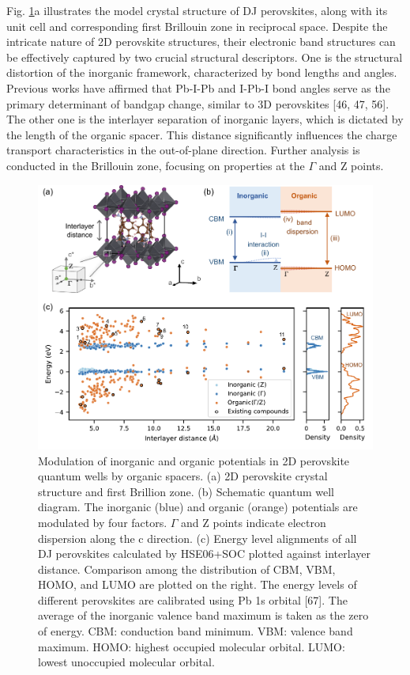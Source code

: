 Fig. \ref{f:fig3}a illustrates the model crystal structure of DJ perovskites, along with its unit cell and corresponding first Brillouin zone in reciprocal space. Despite the intricate nature of 2D perovskite structures, their electronic band structures can be effectively captured by two crucial structural descriptors. One is the structural distortion of the inorganic framework, characterized by bond lengths and angles. Previous works have affirmed that Pb-I-Pb and I-Pb-I bond angles serve as the primary determinant of bandgap change, similar to 3D perovskites [46, 47, 56]. The other one is the interlayer separation of inorganic layers, which is dictated by the length of the organic spacer. This distance significantly influences the charge transport characteristics in the out-of-plane direction. Further analysis is conducted in the Brillouin zone, focusing on properties at the $\Gamma$ and Z points. 

\begin{figure}[!ht]
\centering
\includegraphics[width=\textwidth]{figures/high-throughput-calculation/figure3.pdf}
\caption[Modulation of inorganic and organic potentials in 2D perovskite quantum wells by organic spacers.]{Modulation of inorganic and organic potentials in 2D perovskite quantum wells by organic spacers. (a) 2D perovskite crystal structure and first Brillion zone. (b) Schematic quantum well diagram. The inorganic (blue) and organic (orange) potentials are modulated by four factors. $\Gamma$ and Z points indicate electron dispersion along the c direction. (c) Energy level alignments of all DJ perovskites calculated by HSE06+SOC plotted against interlayer distance. Comparison among the distribution of CBM, VBM, HOMO, and LUMO are plotted on the right. The energy levels of different perovskites are calibrated using Pb 1s orbital [67]. The average of the inorganic valence band maximum is taken as the zero of energy. CBM: conduction band minimum. VBM: valence band maximum. HOMO: highest occupied molecular orbital. LUMO: lowest unoccupied molecular orbital.}
\label{f:fig3}
\end{figure}

